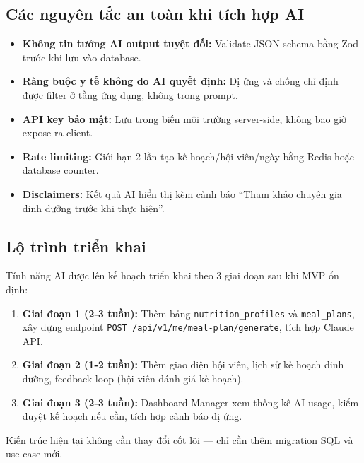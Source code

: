 \subsection{Các nguyên tắc an toàn khi tích hợp AI}
\begin{itemize}
    \item \textbf{Không tin tưởng AI output tuyệt đối:} Validate JSON schema bằng Zod trước khi lưu vào database.
    \item \textbf{Ràng buộc y tế không do AI quyết định:} Dị ứng và chống chỉ định được filter ở tầng ứng dụng, không trong prompt.
    \item \textbf{API key bảo mật:} Lưu trong biến môi trường server-side, không bao giờ expose ra client.
    \item \textbf{Rate limiting:} Giới hạn 2 lần tạo kế hoạch/hội viên/ngày bằng Redis hoặc database counter.
    \item \textbf{Disclaimers:} Kết quả AI hiển thị kèm cảnh báo ``Tham khảo chuyên gia dinh dưỡng trước khi thực hiện''.
\end{itemize}

\subsection{Lộ trình triển khai}
Tính năng AI được lên kế hoạch triển khai theo 3 giai đoạn sau khi MVP ổn định:
\begin{enumerate}
    \item \textbf{Giai đoạn 1 (2-3 tuần):} Thêm bảng \texttt{nutrition\_profiles} và \texttt{meal\_plans}, xây dựng endpoint \texttt{POST /api/v1/me/meal-plan/generate}, tích hợp Claude API.
    \item \textbf{Giai đoạn 2 (1-2 tuần):} Thêm giao diện hội viên, lịch sử kế hoạch dinh dưỡng, feedback loop (hội viên đánh giá kế hoạch).
    \item \textbf{Giai đoạn 3 (2-3 tuần):} Dashboard Manager xem thống kê AI usage, kiểm duyệt kế hoạch nếu cần, tích hợp cảnh báo dị ứng.
\end{enumerate}
Kiến trúc hiện tại không cần thay đổi cốt lõi — chỉ cần thêm migration SQL và use case mới.
